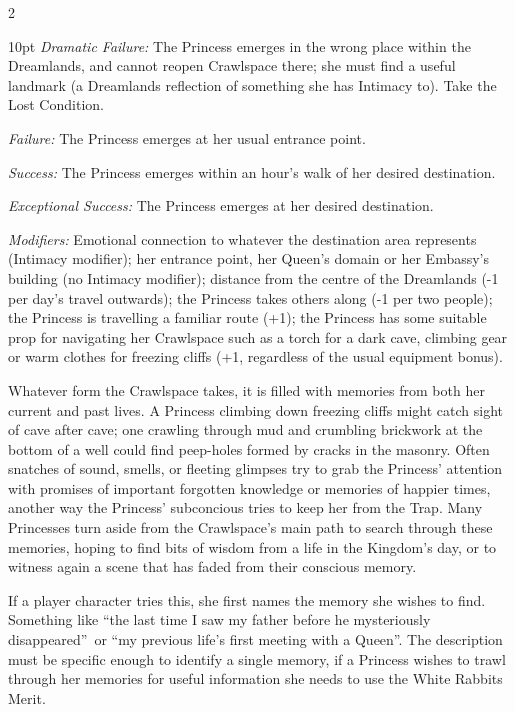 \begin{multicols}{2}
   \begin{myindentpar}{10pt}  \emph{Dramatic Failure:} The Princess emerges in the wrong place within the Dreamlands, and cannot reopen Crawlspace there; she must find a useful landmark (a Dreamlands reflection of something she has Intimacy to). Take the Lost Condition.
   
    \emph{Failure:} The Princess emerges at her usual entrance point.
    
    \emph{Success:} The Princess emerges within an hour's walk of her desired destination.
    
    \emph{Exceptional Success:} The Princess emerges at her desired destination.
    
    \emph{Modifiers:} Emotional connection to whatever the destination area represents (Intimacy modifier); her entrance point, her Queen's domain or her Embassy's building (no Intimacy modifier); distance from the centre of the Dreamlands (-1 per day's travel outwards); the Princess takes others along (-1 per two people); the Princess is travelling a familiar route (+1); the Princess has some suitable prop for navigating her Crawlspace such as a torch for a dark cave, climbing gear or warm clothes for freezing cliffs (+1, regardless of the usual equipment bonus).\end{myindentpar}

Whatever form the Crawlspace takes, it is filled with memories from both her current and past lives. A Princess climbing down freezing cliffs might catch sight of cave after cave; one crawling through mud and crumbling brickwork at the bottom of a well could find peep-holes formed by cracks in the masonry. Often snatches of sound, smells, or fleeting glimpses try to grab the Princess' attention with promises of important forgotten knowledge or memories of happier times, another way the Princess' subconcious tries to keep her from the Trap. Many Princesses turn aside from the Crawlspace's main path to search through these memories, hoping to find bits of wisdom from a life in the Kingdom's day, or to witness again a scene that has faded from their conscious memory. 

If a player character tries this, she first names the memory she wishes to find. Something like \textquotedblleft the last time I saw my father before he mysteriously disappeared\textquotedblright\, or \textquotedblleft my previous life's first meeting with a Queen\textquotedblright . The description must be specific enough to identify a single memory, if a Princess wishes to trawl through her memories for useful information she needs to use the White Rabbits Merit. 


\end{multicols}
